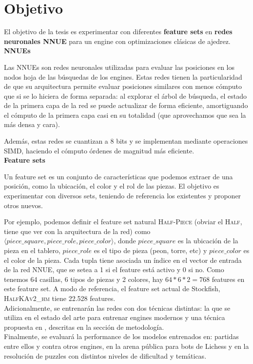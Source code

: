 \newpage
\section*{Objetivo}

El objetivo de la tesis es experimentar con diferentes \textbf{feature sets} en \textbf{redes neuronales NNUE} para un engine con optimizaciones clásicas de ajedrez. \\

\textbf{NNUEs}

Las NNUEs son redes neuronales utilizadas para evaluar las posiciones en los nodos hoja de las búsquedas de los engines. Estas redes tienen la particularidad de que su arquitectura permite evaluar posiciones similares con menos cómputo que si se lo hiciera de forma separada: al explorar el árbol de búsqueda, el estado de la primera capa de la red se puede actualizar de forma eficiente, amortiguando el cómputo de la primera capa casi en su totalidad (que aprovechamos que sea la más densa y cara).

Además, estas redes se cuantizan a 8 bits y se implementan mediante operaciones SIMD, haciendo el cómputo órdenes de magnitud más eficiente. \\

\textbf{Feature sets}

Un feature set es un conjunto de características que podemos extraer de una posición, como la ubicación, el color y el rol de las piezas. El objetivo es experimentar con diversos sets, teniendo de referencia los existentes y proponer otros nuevos.

Por ejemplo, podemos definir el feature set natural \textsc{Half-Piece} (obviar el \textsc{Half}, tiene que ver con la arquitectura de la red) como $\langle piece\_square, piece\_role, piece\_color \rangle$, donde $piece\_square$ es la ubicación de la pieza en el tablero, $piece\_role$ es el tipo de pieza (peon, torre, etc) y $piece\_color$ es el color de la pieza. Cada tupla tiene asociada un índice en el vector de entrada de la red NNUE, que se setea a 1 si el feature está activo y 0 si no. Como tenemos 64 casillas, 6 tipos de piezas y 2 colores, hay $64*6*2=768$ features en este feature set.
A modo de referencia, el feature set actual de Stockfish, \textsc{HalfKAv2\_hm} tiene 22.528 features. \\

Adicionalmente, se entrenarán las redes con dos técnicas distintas: la que se utiliza en el estado del arte para entrenar engines modernos y una técnica propuesta en \cite{dlchess:2014}, descritas en la sección de metodología. \\

Finalmente, se evaluará la performance de los modelos entrenados en: partidas entre ellos y contra otros engines, en la arena pública para bots de Lichess y en la resolución de puzzles con distintos niveles de dificultad y temáticas.
